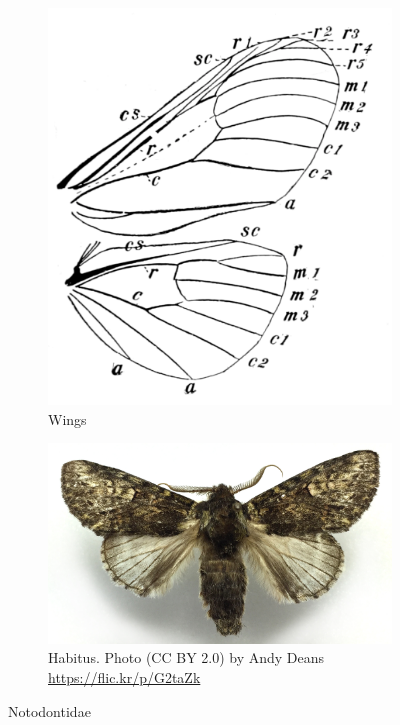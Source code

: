 \documentclass[letterpaper, 11pt]{article}
\begin{document}
\begin{figure}[ht!]
    \centering
    \begin{subfigure}[ht!]{0.32\textwidth}
        \includegraphics[width=\textwidth]{NotodontidWings}
        \caption{Wings \citep[][Fig. 443]{bhl83152}}
        \label{fig:notodontid1}
    \end{subfigure}
    \hfill %
    \begin{subfigure}[ht!]{0.5\textwidth}
        \includegraphics[width=\textwidth]{NotodontidHabitus}
        \caption{Habitus. Photo (CC BY 2.0) by Andy Deans \url{https://flic.kr/p/G2taZk}}
        \label{fig:notodontid2}
    \end{subfigure}
    \caption{Notodontidae}\label{fig:notodontids}
\end{figure}
\end{document}
